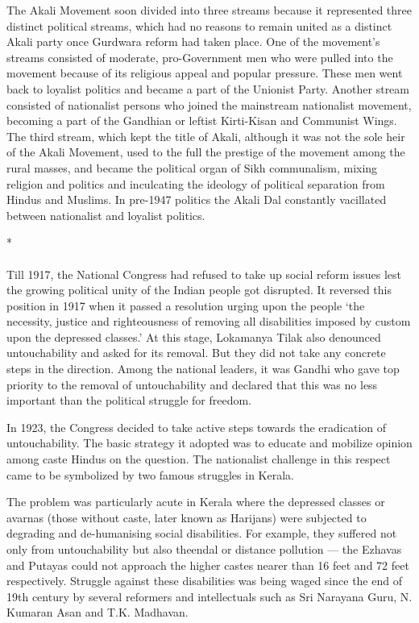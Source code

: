 \begin{multicols}{2}
The Akali Movement soon divided into three streams because it represented three distinct political streams, which had no reasons to remain united as a distinct Akali party once Gurdwara reform had taken place. One of the movement's streams consisted of moderate, pro-Government men who were pulled into the movement because of its religious appeal and popular pressure. These men went back to loyalist politics and became a part of the Unionist Party. Another stream consisted of nationalist persons who joined the mainstream nationalist movement, becoming a part of the Gandhian or leftist Kirti-Kisan and Communist Wings. The third stream, which kept the title of Akali, although it was not the sole heir of the Akali Movement, used to the full the prestige of the movement among the rural masses, and became the political organ of Sikh communalism, mixing religion and politics and inculcating the ideology of political separation from Hindus and Muslims. In pre-1947 politics the Akali Dal constantly vacillated between nationalist and loyalist politics.

\begin{center}*\end{center}

\paragraph*{}
Till 1917, the National Congress had refused to take up social reform issues lest the growing political unity of the Indian people got disrupted. It reversed this position in 1917 when it passed a resolution urging upon the people `the necessity, justice and righteousness of removing all disabilities imposed by custom upon the depressed classes.' At this stage, Lokamanya Tilak also denounced untouchability and asked for its removal. But they did not take any concrete steps in the direction. Among the national leaders, it was Gandhi who gave top priority to the removal of untouchability and declared that this was no less important than the political struggle for freedom.

In 1923, the Congress decided to take active steps towards the eradication of untouchability. The basic strategy it adopted was to educate and mobilize opinion among caste Hindus on the question. The nationalist challenge in this respect came to be symbolized by two famous struggles in Kerala.

The problem was particularly acute in Kerala where the depressed classes or avarnas (those without caste, later known as Harijans) were subjected to degrading and de-humanising social disabilities. For example, they suffered not only from untouchability but also theendal or distance pollution --- the Ezhavas and Putayas could not approach the higher castes nearer than 16 feet and 72 feet respectively. Struggle against these disabilities was being waged since the end of 19th century by several reformers and intellectuals such as Sri Narayana Guru, N. Kumaran Asan and T.K. Madhavan.


\end{multicols}
